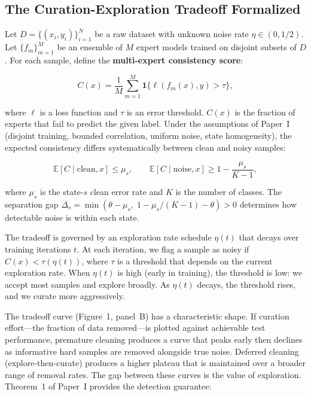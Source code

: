 \documentclass[12pt,a4paper]{article}
\begin{document}
\subsection{The Curation-Exploration Tradeoff Formalized}

Let $D = \{(x_i, y_i)\}_{i=1}^N$ be a raw dataset with unknown noise rate $\eta \in (0, 1/2)$. Let $\{f_m\}_{m=1}^M$ be an ensemble of $M$ expert models trained on disjoint subsets of $D$. For each sample, define the \textbf{multi-expert consistency score}:

\begin{equation}
C(x) = \frac{1}{M} \sum_{m=1}^M \mathbf{1}\bigl\{\ell(f_m(x), y) > \tau\bigr\},
\end{equation}

where $\ell$ is a loss function and $\tau$ is an error threshold. $C(x)$ is the fraction of experts that fail to predict the given label. Under the assumptions of Paper~I (disjoint training, bounded correlation, uniform noise, state homogeneity), the expected consistency differs systematically between clean and noisy samples:

\begin{equation}
\mathbb{E}[C \mid \text{clean}, x] \leq \mu_s, \qquad
\mathbb{E}[C \mid \text{noise}, x] \geq 1 - \frac{\mu_s}{K-1},
\end{equation}

where $\mu_s$ is the state-$s$ clean error rate and $K$ is the number of classes. The separation gap $\Delta_s = \min(\theta - \mu_s,\; 1 - \mu_s/(K-1) - \theta) > 0$ determines how detectable noise is within each state.

The tradeoff is governed by an exploration rate schedule $\eta(t)$ that decays over training iterations $t$. At each iteration, we flag a sample as noisy if $C(x) < \tau(\eta(t))$, where $\tau$ is a threshold that depends on the current exploration rate. When $\eta(t)$ is high (early in training), the threshold is low: we accept most samples and explore broadly. As $\eta(t)$ decays, the threshold rises, and we curate more aggressively.

The tradeoff curve (Figure~1, panel~B) has a characteristic shape. If curation effort---the fraction of data removed---is plotted against achievable test performance, premature cleaning produces a curve that peaks early then declines as informative hard samples are removed alongside true noise. Deferred cleaning (explore-then-curate) produces a higher plateau that is maintained over a broader range of removal rates. The gap between these curves is the value of exploration. Theorem~1 of Paper~I provides the detection guarantee:
\end{document}
